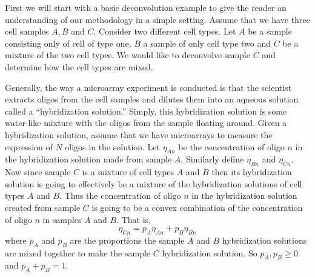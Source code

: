 \documentclass[reqno,12pt,oneside]{report}\usepackage[]{graphicx}\usepackage[]{color}
\theoremstyle{plain}
\theoremstyle{definition}
\theoremstyle{remark}
\numberwithin{theorem}{chapter}     %
\begin{document}
First we will start with a basic deconvolution example to give the reader an understanding of our methodology in a simple setting. Assume that we have three cell samples $A,B$ and $C$. Consider two different cell types. Let $A$ be a sample consisting only of cell of type one, $B$ a sample of only cell type two and $C$ be a mixture of the two cell types. We would like to deconvolve sample $C$ and determine how the cell types are mixed. 

Generally, the way a microarray experiment is conducted is that the scientist extracts oligos from the cell samples and dilutes them into an aqueous solution called a ``hybridization solution.'' Simply, this hybridization solution is some water-like mixture with the oligos from the sample floating around. Given a hybridization solution, assume that we have microarrays to measure the expression of $N$ oligos in the solution. Let $\eta_{An}$ be the concentration of oligo $n$ in the hybridization solution made from sample $A$. Similarly define $\eta_{Bn}$ and $\eta_{Cn}$. Now since sample $C$ is a mixture of cell types $A$ and $B$ then its hybridization solution is going to effectively be a mixture of the hybridization solutions of cell types $A$ and $B$. Thus the concentration of oligo $n$ in the hybridization solution created from sample $C$ is going to be a convex combination of the concentration of oligo $n$ in samples $A$ and $B$. That is, 
\[
\eta_{Cn} = p_A\eta_{An} + p_B\eta_{Bn}
\]
where $p_A$ and $p_B$ are the proportions the sample $A$ and $B$ hybridization solutions are mixed together to make the sample $C$ hybridization solution. So $p_A,p_B\geq 0$ and $p_A+p_B = 1$. 
\end{document}
